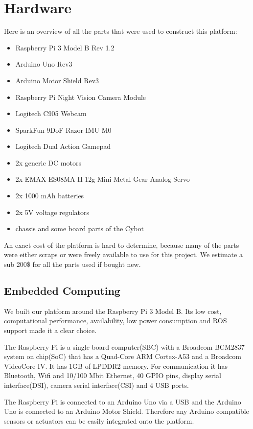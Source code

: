 \documentclass[class=article, crop=false]{standalone}
\begin{document}
\section{Hardware}\label{sec:hardware}
Here is an overview of all the parts that were used to construct this platform:

\begin{itemize}
 \item Raspberry Pi 3 Model B Rev 1.2
 \item Arduino Uno Rev3
 \item Arduino Motor Shield Rev3
 \item Raspberry Pi Night Vision Camera Module
 \item Logitech C905 Webcam
 \item SparkFun 9DoF Razor IMU M0
 \item Logitech Dual Action Gamepad
 \item 2x generic DC motors
 \item 2x EMAX ES08MA II 12g Mini Metal Gear Analog Servo
 \item 2x 1000 mAh batteries
 \item 2x 5V voltage regulators
 \item chassis and some board parts of the Cybot
\end{itemize}

An exact cost of the platform is hard to determine, because many of the parts were either scraps or were freely available to use for this project. We estimate a sub 200\$ for all the parts used if bought new.

\subsection{Embedded Computing}\label{subsec:soc}
We built our platform around the Raspberry Pi 3 Model B. Its low cost, computational performance, availability, low power consumption and ROS support made it a clear choice.

The Raspberry Pi is a single board computer(SBC) with a Broadcom BCM2837 system on chip(SoC) that has a Quad-Core ARM Cortex-A53 and a Broadcom VideoCore IV. It has 1GB of LPDDR2 memory. For communication it has Bluetooth, Wifi and 10/100 Mbit Ethernet, 40 GPIO pins, display serial interface(DSI), camera serial interface(CSI) and 4 USB ports\footnotemark.


The Raspberry Pi is connected to an Arduino Uno via a USB and the Arduino Uno is connected to an Arduino Motor Shield. Therefore any Arduino compatible sensors or actuators can be easily integrated onto the platform.
\end{document}
